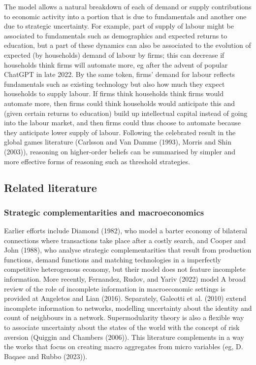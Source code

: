 \documentclass[
]{article}
\theoremstyle{definition}
\theoremstyle{plain}
\theoremstyle{remark}
\begin{document}
The model allows a natural breakdown of each of demand or supply
contributions to economic activity into a portion that is due to
fundamentals and another one due to strategic uncertainty. For example,
part of supply of labour might be associated to fundamentals such as
demographics and expected returns to education, but a part of these
dynamics can also be associated to the evolution of expected (by
households) demand of labour by firms; this can decrease if households
think firms will automate more, eg after the advent of popular ChatGPT
in late 2022. By the same token, firms' demand for labour reflects
fundamentals such as existing technology but also how much they expect
households to supply labour. If firms think households think firms would
automate more, then firms could think households would anticipate this
and (given certain returns to education) build up intellectual capital
instead of going into the labour market, and then firms could thus
choose to automate because they anticipate lower supply of labour.
Following the celebrated result in the global games literature (Carlsson
and Van Damme (1993), Morris and Shin (2003)), reasoning on higher-order
beliefs can be summarised by simpler and more effective forms of
reasoning such as threshold strategies.

\subsection{Related literature}\label{related-literature}

\subsubsection{Strategic complementarities and
macroeconomics}\label{strategic-complementarities-and-macroeconomics}

Earlier efforts include Diamond (1982), who model a barter economy of
bilateral connections where transactions take place after a costly
search, and Cooper and John (1988), who analyse strategic
complementarities that result from production functions, demand
functions and matching technologies in a imperfectly competitive
heterogenous economy, but their model does not feature incomplete
information. More recently, Fernandez, Rudov, and Yariv (2022) model A
broad review of the role of incomplete information in macroeconomic
settings is provided at Angeletos and Lian (2016). Separately, Galeotti
et al. (2010) extend incomplete information to networks, modelling
uncertainty about the identity and count of neighbours in a network.
Supermodularity theory is also a flexible way to associate uncertainty
about the states of the world with the concept of risk aversion (Quiggin
and Chambers (2006)). This literature complements in a way the works
that focus on creating macro aggregates from micro variables (eg, D.
Baqaee and Rubbo (2023)).
\end{document}
